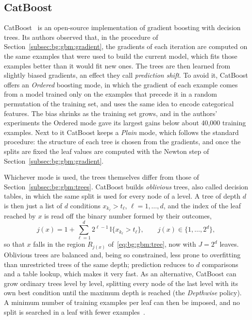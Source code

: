     \subsection{CatBoost}
    \label{subsec:bg:gbm:catboost}
    CatBoost~\cite{prokhorenkova2018,dorogush2018} is an open-source
    implementation of gradient boosting with decision trees. Its authors observed
    that, in the procedure of Section~\ref{subsec:bg:gbm:gradient}, the gradients
    of each iteration are computed on the same examples that were used to build
    the current model, which fits those examples better than it would fit new
    ones. The trees are then learned from slightly biased gradients, an effect
    they call \emph{prediction shift}. To avoid it, CatBoost offers an
    \emph{Ordered} boosting mode, in which the gradient of each example comes
    from a model trained only on the examples that precede it in a random
    permutation of the training set, and uses the same idea to encode
    categorical features. The bias shrinks as the training set grows, and in the
    authors' experiments the Ordered mode gave its largest gains below about
    40{,}000 training examples. Next to it CatBoost keeps a \emph{Plain} mode,
    which follows the standard procedure: the structure of each tree is chosen
    from the gradients, and once the splits are fixed the leaf values are
    computed with the Newton step of Section~\ref{subsec:bg:gbm:gradient}.

    Whichever mode is used, the trees themselves differ from those of
    Section~\ref{subsec:bg:gbm:trees}. CatBoost builds \emph{oblivious} trees,
    also called decision tables, in which the same split is used for every node of
    a level. A tree of depth $d$ is then
    just a list of $d$ conditions $x_{k_\ell} > t_\ell$, $\ell = 1, \dots, d$, and
    the index of the leaf reached by $x$ is read off the binary number formed by
    their outcomes,
    \begin{equation}
    j(x) = 1 + \sum_{\ell=1}^{d} 2^{\ell - 1}\, \mathbb{I}\{x_{k_\ell} > t_\ell\},
    \qquad j(x) \in \{1, \dots, 2^{d}\},
    \label{eq:bg:gbm:oblivious}
    \end{equation}
    so that $x$ falls in the region $R_{j(x)}$ of~\eqref{eq:bg:gbm:tree}, now with
    $J = 2^d$ leaves. Oblivious trees are balanced and, being so constrained,
    less prone to overfitting than unrestricted trees of the same depth;
    prediction reduces to $d$ comparisons and a table lookup, which makes it very
    fast. As an alternative, CatBoost can
    grow ordinary trees level by level, splitting every node of the last level
    with its own best condition until the maximum depth is reached (the
    \emph{Depthwise} policy). A minimum number of training examples per leaf can
    then be imposed, and no split is searched in a leaf with fewer
    examples~\cite{catboostdocs}.

